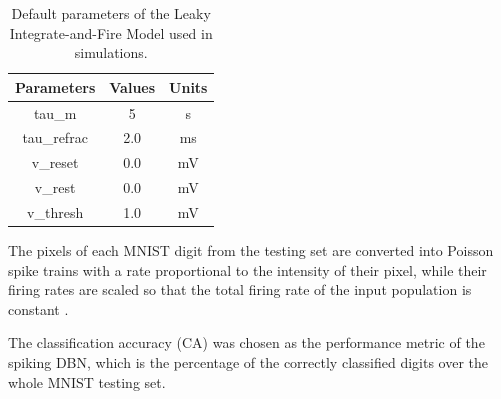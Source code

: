 %
\begin{table}[hbbp]
\centering
\caption{\label{Tab:NeuralParams}Default parameters of the Leaky Integrate-and-Fire Model used in simulations.}
\bgroup
\def\arraystretch{1.1}
  \begin{tabular}{c|c|c}
  Parameters & Values & Units \\
  \hline
  tau\_m & 5 & s\\
  tau\_refrac & 2.0 & ms\\
  v\_reset & 0.0 & mV\\
  v\_rest & 0.0 & mV\\
  v\_thresh & 1.0 & mV\\
  \end{tabular}
\egroup
\end{table}

The pixels of each MNIST digit from the testing set are converted into Poisson spike trains with a rate proportional to the intensity of their pixel, while their firing rates are scaled so that the total firing rate of the input population is constant \citep{10.3389/fnins.2013.00178}.
  
The classification accuracy (CA) was chosen as the performance metric of the spiking DBN, which is the percentage of the correctly classified digits over the whole MNIST testing set.
 





